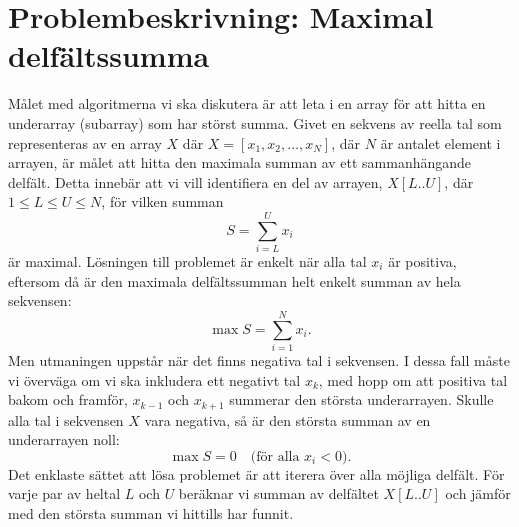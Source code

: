 \documentclass[a4paper,12pt]{article}
\begin{document}
\section{Problembeskrivning: Maximal delfältssumma}
\label{sec:problembeskrivning}
Målet med algoritmerna vi ska diskutera är att leta i en array för att hitta en
underarray (subarray) som har störst summa. Givet en sekvens av reella tal som
representeras av en array $X$ där $X = [x_1, x_2, \ldots, x_N]$, där $N$ är
antalet element i arrayen, är målet att hitta den maximala summan av ett
sammanhängande delfält. Detta innebär att vi vill identifiera en del av
arrayen, $X[L..U]$, där $1 \leq L \leq U \leq N$, för vilken summan
\begin{displaymath}
  S = \sum_{i=L}^{U} x_i
\end{displaymath}
är maximal. Lösningen till problemet är enkelt när alla tal $x_i$ är positiva,
eftersom då är den maximala delfältssumman helt enkelt summan av hela
sekvensen:
\begin{displaymath}
  \max S = \sum_{i=1}^{N} x_i.
\end{displaymath}
Men utmaningen uppstår när det finns negativa tal i sekvensen. I dessa fall
måste vi överväga om vi ska inkludera ett negativt tal $x_k$, med hopp om att
positiva tal bakom och framför, $x_{k-1}$ och $x_{k+1}$ summerar den största
underarrayen. Skulle alla tal i sekvensen $X$ vara negativa, så är den största
summan av en underarrayen noll:
\begin{displaymath}
  \max S = 0 \quad \text{(för alla } x_i < 0\text{)}.
\end{displaymath}
Det enklaste sättet att lösa problemet är att iterera över alla möjliga
delfält. För varje par av heltal $L$ och $U$ beräknar vi summan av delfältet
$X[L..U]$ och jämför med den största summan vi hittills har funnit.
%
\end{document}
